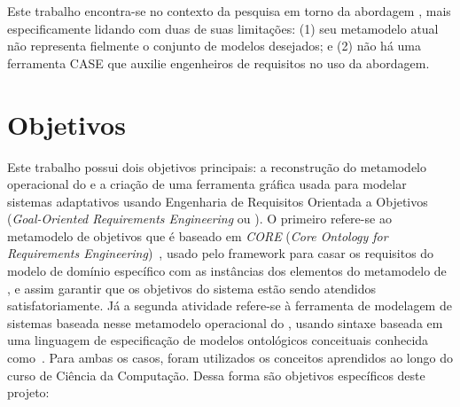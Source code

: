 
Este trabalho encontra-se no contexto da pesquisa em torno da abordagem \zanshin, mais especificamente lidando com duas de suas limitações: (1) seu metamodelo atual não representa fielmente o conjunto de modelos desejados; e (2) não há uma ferramenta CASE que auxilie engenheiros de requisitos no uso da abordagem.



\section{Objetivos}
\label{sec-intro-objetivos}

Este trabalho possui dois objetivos principais: a reconstrução do metamodelo operacional do \zanshin e a criação de uma ferramenta gráfica usada para modelar sistemas adaptativos usando Engenharia de Requisitos Orientada a Objetivos (\textit{Goal-Oriented Requirements Engineering} ou \gore). O primeiro refere-se ao metamodelo de objetivos que é baseado em \textit{CORE} (\textit{Core Ontology for Requirements Engineering})~\cite{jureta2007core}, usado pelo framework para casar os requisitos do modelo de domínio específico com as instâncias dos elementos do metamodelo de \gore, e assim garantir que os objetivos do sistema estão sendo atendidos satisfatoriamente. Já a segunda atividade refere-se à ferramenta de modelagem de sistemas baseada nesse metamodelo operacional do \zanshin, usando sintaxe baseada em uma linguagem de especificação de modelos ontológicos conceituais conhecida como\istar~\cite{dalpiaz2016istar}. Para ambas os casos, foram utilizados os conceitos aprendidos ao longo do curso de Ciência da Computação. Dessa forma são objetivos específicos deste projeto:


